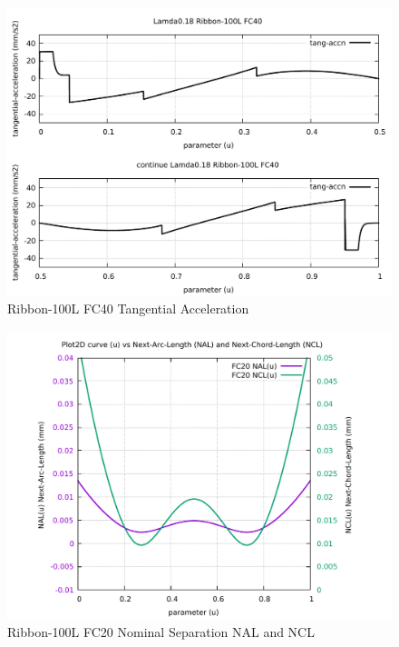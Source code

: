 \begin{figure}
	\caption     {Ribbon-100L FC40 Tangential Acceleration}
	\label{24-img-Ribbon-100L-FC40-Tangential-Acceleration.pdf}
\includegraphics[width=1.00\textwidth]{Chap4/appendix/app-Ribbon-100L/plots/24-img-Ribbon-100L-FC40-Tangential-Acceleration.pdf}
\end{figure}

\clearpage
\pagebreak

\begin{figure}
	\caption     {Ribbon-100L FC20 Nominal Separation NAL and NCL}
	\label{25-img-Ribbon-100L-FC20-Nominal-Separation-NAL-and-NCL.pdf}
\includegraphics[width=1.00\textwidth]{Chap4/appendix/app-Ribbon-100L/plots/25-img-Ribbon-100L-FC20-Nominal-Separation-NAL-and-NCL.pdf}
\end{figure}


